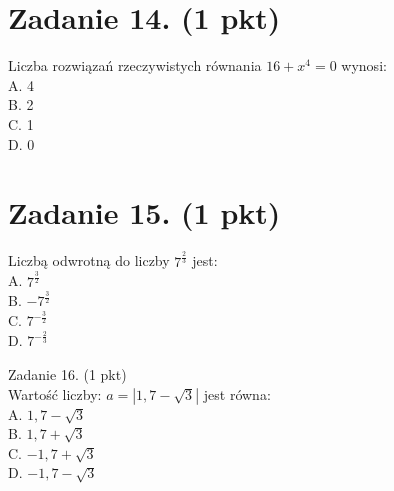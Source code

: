 \documentclass[10pt]{article}
\begin{document}
\section*{Zadanie 14. (1 pkt)}
Liczba rozwiązań rzeczywistych równania \(16+x^{4}=0\) wynosi:\\
A. 4\\
B. 2\\
C. 1\\
D. 0

\section*{Zadanie 15. (1 pkt)}
Liczbą odwrotną do liczby \(7^{\frac{2}{3}}\) jest:\\
A. \(7^{\frac{3}{2}}\)\\
B. \(-7^{\frac{3}{2}}\)\\
C. \(7^{-\frac{3}{2}}\)\\
D. \(7^{-\frac{2}{3}}\)

Zadanie 16. (1 pkt)\\
Wartość liczby: \(a=|1,7-\sqrt{3}|\) jest równa:\\
A. \(1,7-\sqrt{3}\)\\
B. \(1,7+\sqrt{3}\)\\
C. \(-1,7+\sqrt{3}\)\\
D. \(-1,7-\sqrt{3}\)
\end{document}
